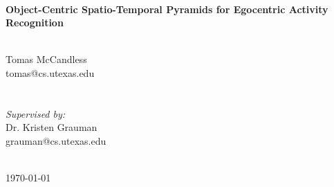 \documentclass[12pt]{article} %
\begin{document}
\begin{titlepage}
\HRule \\[0.4cm]
{ \huge \bfseries Object-Centric Spatio-Temporal Pyramids for Egocentric Activity Recognition}\\[0.4cm] %
\HRule \\[0.5cm]
%
\begin{center}
  \Large
  Tomas McCandless\\
  tomas@cs.utexas.edu
  \\ $\;$ \\ $\;$\\
  \large
  \emph{Supervised by:}\\
  Dr. Kristen Grauman\\
  grauman@cs.utexas.edu\\
  $\;$\\
\end{center}

{\normalsize \today}\\[3cm] 
\vfill %

\end{titlepage}


\tableofcontents %

\newpage %

\end{document}
